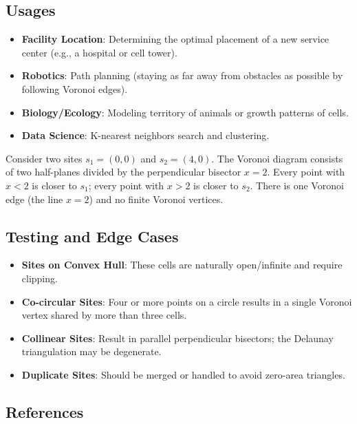 \subsection{Usages}

\begin{itemize}
\item \textbf{Facility Location}: Determining the optimal placement of a new service center (e.g., a hospital or cell tower).
\item \textbf{Robotics}: Path planning (staying as far away from obstacles as possible by following Voronoi edges).
\item \textbf{Biology/Ecology}: Modeling territory of animals or growth patterns of cells.
\item \textbf{Data Science}: K-nearest neighbors search and clustering.
\end{itemize}

\begin{example}\label{ex:voronoi_two_sites}
Consider two sites $s_1 = (0, 0)$ and $s_2 = (4, 0)$. The Voronoi diagram consists of two half-planes divided by the perpendicular bisector $x = 2$. Every point with $x < 2$ is closer to $s_1$; every point with $x > 2$ is closer to $s_2$. There is one Voronoi edge (the line $x=2$) and no finite Voronoi vertices.
\end{example}

\subsection{Testing and Edge Cases}

\begin{itemize}
\item \textbf{Sites on Convex Hull}: These cells are naturally open/infinite and require clipping.
\item \textbf{Co-circular Sites}: Four or more points on a circle results in a single Voronoi vertex shared by more than three cells.
\item \textbf{Collinear Sites}: Result in parallel perpendicular bisectors; the Delaunay triangulation may be degenerate.
\item \textbf{Duplicate Sites}: Should be merged or handled to avoid zero-area triangles.
\end{itemize}

\subsection{References}

